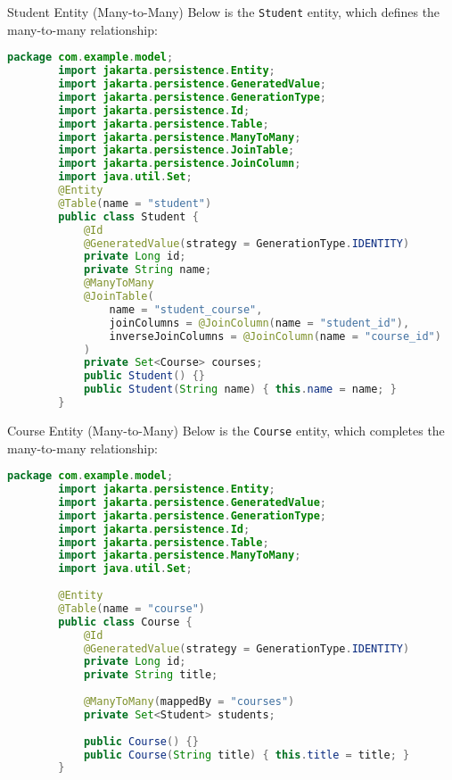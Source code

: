 \documentclass[aspectratio=169, table]{beamer}
\begin{document}
\begin{frame}[fragile]{Student Entity (Many-to-Many)}
	\vspace{30pt}
	Below is the \texttt{Student} entity, which defines the many-to-many relationship:
	
	\begin{lstlisting}[language=Java, style=JavaStyle]
		package com.example.model;
		import jakarta.persistence.Entity;
		import jakarta.persistence.GeneratedValue;
		import jakarta.persistence.GenerationType;
		import jakarta.persistence.Id;
		import jakarta.persistence.Table;
		import jakarta.persistence.ManyToMany;
		import jakarta.persistence.JoinTable;
		import jakarta.persistence.JoinColumn;
		import java.util.Set;
		@Entity
		@Table(name = "student")
		public class Student {
			@Id
			@GeneratedValue(strategy = GenerationType.IDENTITY)
			private Long id;
			private String name;
			@ManyToMany
			@JoinTable(
				name = "student_course",
				joinColumns = @JoinColumn(name = "student_id"),
				inverseJoinColumns = @JoinColumn(name = "course_id")
			)
			private Set<Course> courses;
			public Student() {}
			public Student(String name) { this.name = name; }
		}
	\end{lstlisting}
\end{frame}

\begin{frame}[fragile]{Course Entity (Many-to-Many)}
	\vspace{20pt}
	Below is the \texttt{Course} entity, which completes the many-to-many relationship:
	
	\begin{lstlisting}[language=Java, style=JavaStyle]
		package com.example.model;
		import jakarta.persistence.Entity;
		import jakarta.persistence.GeneratedValue;
		import jakarta.persistence.GenerationType;
		import jakarta.persistence.Id;
		import jakarta.persistence.Table;
		import jakarta.persistence.ManyToMany;
		import java.util.Set;
		
		@Entity
		@Table(name = "course")
		public class Course {
			@Id
			@GeneratedValue(strategy = GenerationType.IDENTITY)
			private Long id;
			private String title;
			
			@ManyToMany(mappedBy = "courses")
			private Set<Student> students;
			
			public Course() {}
			public Course(String title) { this.title = title; }
		}
	\end{lstlisting}
\end{frame}
\end{document}

